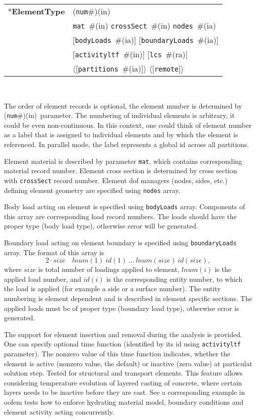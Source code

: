 \documentclass[a4paper]{article}
\makeatletter
\newcommand{\param}[1]{\texttt{#1}} %
\newcommand{\optional}[1]{[#1]} %
\newcommand{\field}[2]{\param{#1}~\#{\tiny(#2)}} %
\newcommand{\optField}[2]{\optional{\field{#1}{#2}}}
\newcommand{\optFieldnotype}[1]{[\param{#1}]}
\newcommand{\componentNum}{(\param{num}\#){\tiny(in)}} %
\newcommand{\entKeyword}[1]{*\textbf{#1}} %
\newcommand{\Pmode}[1]{{\sffamily #1}}
\newcommand{\oofemParallel}[1]{$\langle${#1}$\rangle$}
\newcommand{\PoptField}[2]{\oofemParallel{\optField{#1}{#2}}}
\newcommand{\PoptFieldnotype}[1]{\oofemParallel{\optFieldnotype{#1}}}
\newenvironment{record}[1][]{\begin{tabular}{|ll}}{\end{tabular}\\}
\newcommand{\recentry}[2]{{#1}&{#2}\\}
\newcounter{rcc}
\newenvironment{record}[1][\textwidth]{\setcounter{rcc}{0}\begin{tabular*}{#1}{|ll@{\extracolsep{\fill}}r}}{\end{tabular*}\\}
\newcommand{\recentry}[2]{\ifthenelse{\value{rcc}>0}{&$\backslash$ \\}{\setcounter{rcc}{1}}{#1}&{#2}}
\makeatother
\begin{document}
\noindent
\begin{record}
  \recentry{\entKeyword{ElementType}}{\componentNum}
  \recentry{}{\field{mat}{in} \field{crossSect}{in} \field{nodes}{ia}}
  \recentry{}{\optField{bodyLoads}{ia} \optField{boundaryLoads}{ia}}
  \recentry{}{\optField{activityltf}{in} \optField{lcs}{ra}}
  \recentry{}{\PoptField{partitions}{ia} \PoptFieldnotype{remote}}
\end{record}

The order of element records is optional, the element number is determined by \componentNum\ parameter.
The numbering of individual elements is arbitrary, it could be even non-continuous. In this context, one could think of element number as a label that is assigned to individual elements and by which the element is referenced.
\Pmode{In parallel mode, the label represents a global id across all partitions.}

Element
material is described by parameter \param{mat}, which contains corresponding
material record number. Element cross
section is determined by cross section  with  \param{crossSect}
record number. Element dof managers (nodes, sides, etc.) defining element geometry are specified using
\param{nodes} array.

Body load acting on element is specified using \param{bodyLoads} array. Components
of this array are corresponding load record numbers. The loads should
have the proper type (body load type), otherwise error will be generated.

Boundary load acting on element boundary is specified using
\param{boundaryLoads} array. The format of this array is
\begin{displaymath}
2\cdot size \quad lnum(1)~id(1)~\dots~lnum(size)~id(size),
\end{displaymath}
where $size$ is total number of loadings applied to element,
$lnum(i)$ is the applied load number, and $id(i)$
is the corresponding entity number, to which the load is applied (for example
a side or a surface number). The entity numbering is element dependent and
is described in element specific sections. The applied loads must be
of proper type (boundary load type), otherwise error is generated.

The support for element insertion and removal during the analysis is provided. One can specify optional time function (identified by its id using \param{activityltf} parameter). The nonzero value of this time function indicates, whether the element is active (nonzero value, the default) or inactive (zero value) at particulat solution step. Tested for structural and transport elements. This feature allows considering temperature evolution of layered casting of concrete, where certain layers needs to be inactive before they are cast. See a corresponding example in oofem
tests how to enforce hydrating material model, boundary conditions and element activity acting concurrently.
\end{document}
